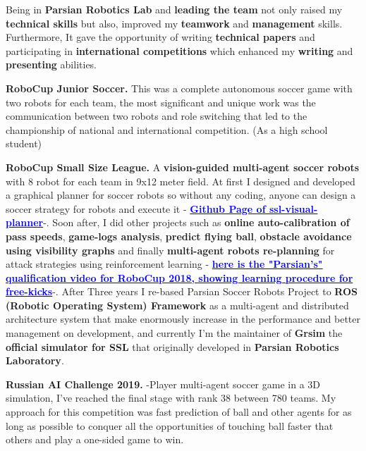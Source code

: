 \documentclass[11pt, a4paper]{awesome-cv}
\begin{document}
\begin{cvletter}
Being in \textbf{Parsian Robotics Lab} and \textbf{leading the team} not only raised my \textbf{technical skills} but also, improved my \textbf{teamwork} and \textbf{management} skills. Furthermore, It gave the opportunity of writing \textbf{technical papers} and participating in \textbf{international competitions} which enhanced my \textbf{writing} and \textbf{presenting} abilities.




\textbf{RoboCup Junior Soccer.} \newline
This was a complete autonomous soccer game with two robots for each team, the most significant and unique work was the communication between two robots and role switching that led to the championship of national and international competition. (As a high school student)

\textbf{RoboCup Small Size League.} \newline
A \textbf{vision-guided multi-agent soccer robots} with 8 robot for each team in 9x12 meter field. At first I designed and developed a graphical planner for soccer robots so without any coding, anyone can design a soccer strategy for robots and execute it - 
\href{http://github.com/ParsianRoboticLab/ssl-visual-planner}{\textcolor{blue}{\textbf{Github Page of ssl-visual-planner}}}-. Soon after, I did other projects such as \textbf{online auto-calibration of pass speeds}, \textbf{game-logs analysis}, \textbf{predict flying ball}, \textbf{obstacle avoidance using visibility graphs} and finally \textbf{multi-agent robots re-planning} for attack strategies using reinforcement learning - 
\href{https://www.youtube.com/watch?v=SfxZtV8uzFQ}{\textcolor{blue}{\textbf{here is the "Parsian's" qualification video for RoboCup 2018, showing learning procedure for free-kicks}}}-.
After Three years I re-based Parsian Soccer Robots Project to \textbf{ROS (Robotic Operating System) Framework} as a multi-agent and distributed architecture system that make enormously increase in the performance and better management on development, and currently I'm the maintainer of \textbf{Grsim} the \textbf{official simulator for SSL} that originally developed in \textbf{Parsian Robotics Laboratory}.

\textbf{Russian AI Challenge 2019.} -Player multi-agent soccer game in a 3D simulation, I've reached the final stage with rank 38 between 780 teams. My approach for this competition was fast prediction of ball and other agents for as long as possible to conquer all the opportunities of touching ball faster that others and play a one-sided game to win. 


\end{cvletter}
\end{document}
